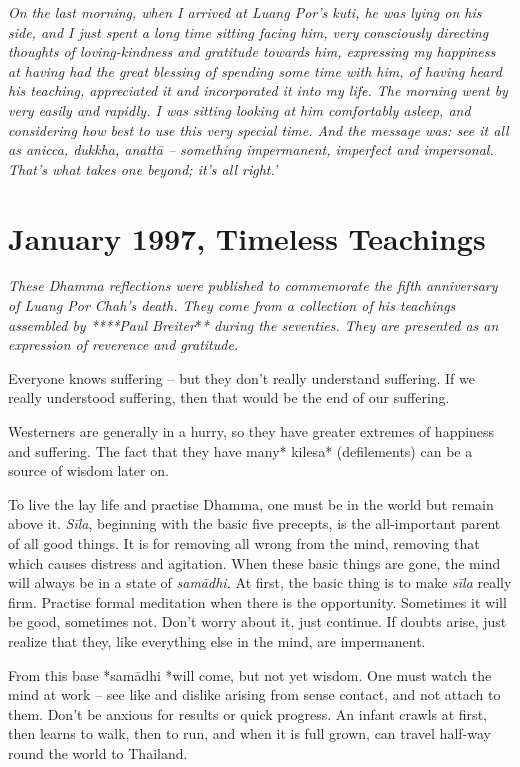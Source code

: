\emph{On the last morning, when I arrived at Luang Por's kuti, he was
lying on his side, and I just spent a long time sitting facing him, very
consciously directing thoughts of loving-kindness and gratitude towards
him, expressing my happiness at having had the great blessing of
spending some time with him, of having heard his teaching, appreciated
it and incorporated it into my life. The morning went by very easily and
rapidly. I was sitting looking at him comfortably asleep, and
considering how best to use this very special time. And the message was:
see it all as anicca, dukkha, anattā -- something impermanent, imperfect
and impersonal. That's what takes one beyond; it's all right.'}

\chapter{January 1997, Timeless Teachings}

\emph{These Dhamma reflections were published to commemorate the fifth
anniversary of Luang Por Chah's death. They come from a collection of
his teachings assembled by ****Paul Breiter}*\emph{* during the
seventies. They are presented as an expression of reverence and
gratitude.}

Everyone knows suffering -- but they don't really understand suffering.
If we really understood suffering, then that would be the end of our
suffering.

Westerners are generally in a hurry, so they have greater extremes of
happiness and suffering. The fact that they have many* kilesa*
(defilements) can be a source of wisdom later on.

To live the lay life and practise Dhamma, one must be in the world but
remain above it. \emph{Sīla}, beginning with the basic five precepts, is
the all-important parent of all good things. It is for removing all
wrong from the mind, removing that which causes distress and agitation.
When these basic things are gone, the mind will always be in a state of
\emph{samādhi.} At first, the basic thing is to make \emph{sīla} really
firm. Practise formal meditation when there is the opportunity.
Sometimes it will be good, sometimes not. Don't worry about it, just
continue. If doubts arise, just realize that they, like everything else
in the mind, are impermanent.

From this base *samādhi *will come, but not yet wisdom. One must watch
the mind at work -- see like and dislike arising from sense contact, and
not attach to them. Don't be anxious for results or quick progress. An
infant crawls at first, then learns to walk, then to run, and when it is
full grown, can travel half-way round the world to Thailand.

